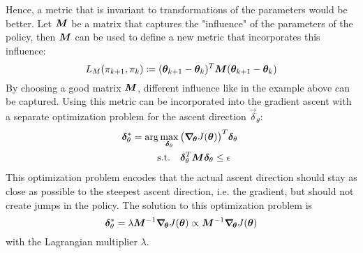 			Hence, a metric that is invariant to transformations of the parameters would be better. Let \(\bm{M}\) be a matrix that captures the "influence" of the parameters of the policy, then \(\bm{M}\) can be used to define a new metric that incorporates this influence:
			\begin{equation*}
				L_M(\pi_{k + 1}, \pi_k) \coloneqq (\bm{\theta}_{k + 1} - \bm{\theta}_k)^T \bm{M} (\bm{\theta}_{k + 1} - \bm{\theta}_k)
			\end{equation*}
			By choosing a good matrix \(\bm{M}\), different influence like in the example above can be captured. Using this metric can be incorporated into the gradient ascent with a separate optimization problem for the ascent direction \( \vec{\delta}_\theta \):
			\begin{equation}
				\begin{aligned}
					\bm{\delta}_\theta^\ast = \arg\max_{\bm{\delta}_\theta} \, & \big( \grad_{\!\bm{\theta}} J(\bm{\theta}) \big)^T \bm{\delta}_\theta \\
					\mathrm{s.t.} \quad                                          &
					\begin{aligned}[t]
						\bm{\delta}_\theta^T \bm{M} \bm{\delta}_\theta & \leq \epsilon
					\end{aligned}
				\end{aligned}  \label{eq:policyGradientAscentOpt}
			\end{equation}
			This optimization problem encodes that the actual ascent direction should stay as close as possible to the steepest ascent direction, i.e. the gradient, but should not create jumps in the policy. The solution to this optimization problem is
			\begin{equation*}
				\bm{\delta}_\theta^\ast = \lambda \bm{M}^{-1} \grad_{\!\bm{\theta}} J(\bm{\theta}) \propto \bm{M}^{-1} \grad_{\!\bm{\theta}} J(\bm{\theta})
			\end{equation*}
			with the Lagrangian multiplier \(\lambda\).

